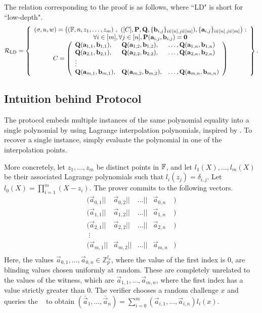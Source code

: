 The relation corresponding to the proof is as follows, where ``LD" is short for ``low-depth". $$\mathcal{R}_\mathrm{LD}= \left\{\begin{array}{c}
(\mathsf{\sigma},u,w)=\left( (\mathbb{F},n,z_1,\ldots,z_m)\ , \  ([C],\mathbf{P},\mathbf{Q},\lbrace \mathbf{b}_{i,j} \rbrace_{i \in [n], j \in [m]}), \lbrace \mathbf{a}_{i,j} \rbrace_{i \in [n], j \in [m]} \right):\\
\forall i \in [m], \forall j \in [n], \mathbf{P}(\mathbf{a}_{i,j},\mathbf{b}_{i,j})=\mathbf{0} \\
C = \left(\begin{array}{lll}
\mathbf{Q}(\mathbf{a}_{1,1},\mathbf{b}_{1,1}),&\mathbf{Q}(\mathbf{a}_{1,2},\mathbf{b}_{1,2}),& \ldots,\mathbf{Q}(\mathbf{a}_{1,n},\mathbf{b}_{1,n}) \\
\mathbf{Q}(\mathbf{a}_{2,1},\mathbf{b}_{2,1}),&\mathbf{Q}(\mathbf{a}_{2,2},\mathbf{b}_{2,2}),& \ldots,\mathbf{Q}(\mathbf{a}_{2,n},\mathbf{b}_{2,n}) \\
\vdots \\
\mathbf{Q}(\mathbf{a}_{m,1},\mathbf{b}_{m,1}),&\mathbf{Q}(\mathbf{a}_{m,2},\mathbf{b}_{m,2}),& \ldots,\mathbf{Q}(\mathbf{a}_{m,n},\mathbf{b}_{m,n}) \\
\end{array}\right)
\end{array}\right\}.$$

\subsection{Intuition behind Protocol}
The protocol embeds multiple instances of the same polynomial equality into a single polynomial by using Lagrange interpolation polynomials, inspired by \cite{Gennaro2013,Bayer2014}. To recover a single instance, simply evaluate the polynomial in one of the interpolation points.

More concretely, let $z_1,\ldots,z_m$ be distinct points in $\mathbb{F}$, and let $l_1(X),\ldots,l_m(X)$ be their associated Lagrange polynomials such that $l_i(z_j)=\delta_{i,j}$. Let $l_0(X) = \prod_{i=1}^m (X-z_i)$. The prover commits to the following vectors.
$$\begin{array}{llllll}
(\vec{a}_{0,1}||&\vec{a}_{0,2}||&\ldots||&\vec{a}_{0,n}&) \\
(\vec{a}_{1,1}||&\vec{a}_{1,2}||&\ldots||&\vec{a}_{1,n}&) \\
(\vec{a}_{2,1}||&\vec{a}_{2,2}||&\ldots||&\vec{a}_{2,n}&) \\
\;\vdots \\
(\vec{a}_{m,1}||&\vec{a}_{m,2}||&\ldots||&\vec{a}_{m,n}&) \\
\end{array}$$
Here, the values $\vec{a}_{0,1},\ldots,\vec{a}_{0,n} \in \mathbb{Z}_p^{l_a}$, where the value of the first index is $0$, are blinding values chosen uniformly at random. These are completely unrelated to the values of the witness, which are $\vec{a}_{1,1},\ldots,\vec{a}_{m,n}$, where the first index has a value strictly greater than $0$. The verifier chooses a random challenge $x$ and queries the \ILC~ to obtain $(\bar{\vec{a}}_1,\ldots,\bar{\vec{a}}_n) = \sum_{i=0}^m (\vec{a}_{i,1},\ldots,\vec{a}_{i,n}) l_i(x)$.

